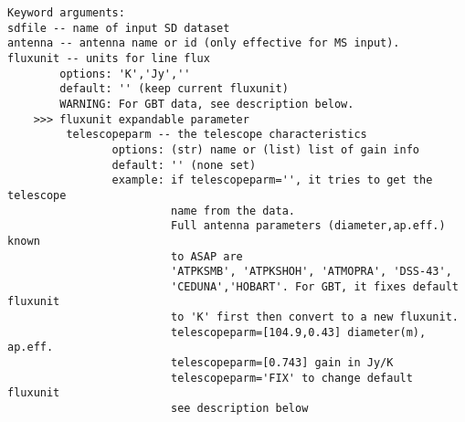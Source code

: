 \begin{verbatim}
Keyword arguments:
sdfile -- name of input SD dataset
antenna -- antenna name or id (only effective for MS input). 
fluxunit -- units for line flux
        options: 'K','Jy',''
        default: '' (keep current fluxunit)
        WARNING: For GBT data, see description below.
    >>> fluxunit expandable parameter
         telescopeparm -- the telescope characteristics
                options: (str) name or (list) list of gain info
                default: '' (none set)
                example: if telescopeparm='', it tries to get the telescope
                         name from the data.
                         Full antenna parameters (diameter,ap.eff.) known
                         to ASAP are
                         'ATPKSMB', 'ATPKSHOH', 'ATMOPRA', 'DSS-43',
                         'CEDUNA','HOBART'. For GBT, it fixes default fluxunit
                         to 'K' first then convert to a new fluxunit.
                         telescopeparm=[104.9,0.43] diameter(m), ap.eff.
                         telescopeparm=[0.743] gain in Jy/K
                         telescopeparm='FIX' to change default fluxunit
                         see description below


\end{verbatim}
